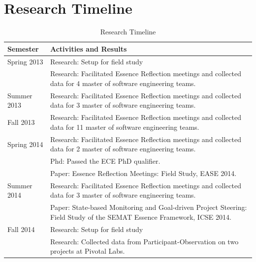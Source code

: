\documentclass[preprint,12pt,3p]{elsarticle}
\begin{document}

\appendix
\section{Research Timeline}
\label{appendix}

\begin{table}[H]
\caption{Research Timeline}
\label{ResearchTimeline}
\centering
\begin{tabular}{|p{1.00in}|p{5.00in}|}
\hline
Semester    & Activities and Results  \\ \hline
Spring 2013 & Research: Setup for field study \\
            & Research: Facilitated Essence Reflection meetings and collected data for 4 master of software engineering teams. \\ \hline
Summer 2013 & Research: Facilitated Essence Reflection meetings and collected data for 3 master of software engineering teams.  \\ \hline
Fall 2013   & Research: Facilitated Essence Reflection meetings and collected data for 11 master of software engineering teams.  \\ \hline
Spring 2014 & Research: Facilitated Essence Reflection meetings and collected data for 2 master of software engineering teams.\\ 
            & Phd: Passed the ECE PhD qualifier.\\ 
            & Paper: Essence Reflection Meetings: Field Study, EASE 2014. \cite{EASE2014} \\ \hline
Summer 2014 & Research: Facilitated Essence Reflection meetings and collected data for 3 master of software engineering teams.\\ 
            & Paper: State-based Monitoring and Goal-driven Project Steering: Field Study of the SEMAT Essence Framework, ICSE 2014. \cite{ICSE2014} \\ \hline
Fall 2014   & Research: Setup for field study \\
            & Research: Collected data from Participant-Observation on two projects at Pivotal Labs.  \\ \hline

\end{tabular}
\end{table}
\end{document}
